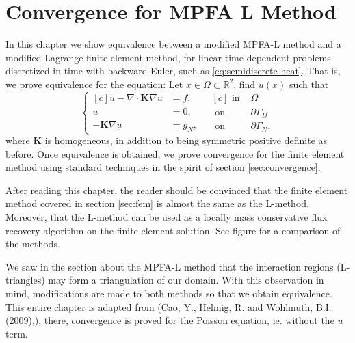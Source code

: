 \documentclass[../Main/main.tex]{subfiles}
\begin{document}
	\chapter{Convergence for MPFA L Method}
	\graphicspath{{../Equivalence between MPFA-L and FEM/figs/}}
	In this chapter we show equivalence between a modified MPFA-L method and a modified Lagrange finite element method, for linear time dependent problems discretized in time with backward Euler, such as  \eqref{eq:semidiscrete heat}.
	 That is, we prove equivalence for the equation: Let $x\in \Omega \subset \mathbb{R}^2$, find $u(x)$ such that
	\begin{equation}\label{eq:stationary_heat}
	\left \{
	\begin{aligned}[c]
		u - \nabla \cdot\bm{K} \nabla u &= f, \\
		u &= 0, \\
		-\pmb{K}\nabla u &= g_N,
	\end{aligned}
	\ \ \
	\begin{aligned}[c]
		\text{ in }& \Omega \\
		\text{ on }& \partial \Gamma_D \\
		\text{ on }& \partial \Gamma_N ,
	\end{aligned}
	\right.
	\end{equation}
	where $\bm{K}$ is homogeneous, in addition to being symmetric positive definite as before.
	Once equivalence is obtained, we prove convergence for the finite element method using standard techniques in the spirit of section \ref{sec:convergence}. 
	\par
	After reading this chapter, the reader should be convinced that the finite element method covered in section \ref{sec:fem} is almost the same as the L-method. Moreover, that the L-method can be used as a locally mass conservative flux recovery algorithm on the finite element solution. See figure  for a comparison of the methods.
	\par
	We saw in the section about the MPFA-L method that the interaction regions (L-triangles) may form a triangulation of our domain.
	With this observation in mind, modifications are made to both methods so that we obtain equivalence. This entire chapter is adapted from (Cao, Y., Helmig, R. and Wohlmuth, B.I. (2009),\cite{https://doi.org/10.1002/num.20525}), there, convergence is proved for the Poisson equation, ie. without the $u$ term.
\end{document}
